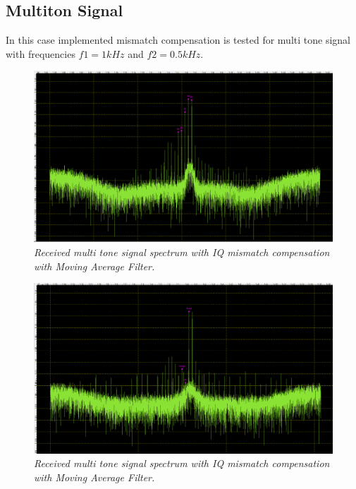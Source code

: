 \documentclass[en,printmode]{mgr}
\begin{document}
		\newpage
   		\subsection*{Multiton Signal}
   		In this case implemented mismatch compensation is tested for
		multi tone signal with frequencies $f1=1kHz$ and $f2=0.5kHz$.
		
		\begin{figure}[H]
    		\centering
   			\includegraphics[width=\textwidth]{plots/multi_input.png}
   		 	\caption{\textit{Received multi tone signal spectrum with IQ mismatch compensation with
   		 	Moving Average Filter.}}
   		\end{figure}	
   		
  		\begin{figure}[H]
    		\centering
   			\includegraphics[width=\textwidth]{plots/my_multi_mav.png}
   		 	\caption{\textit{Received multi tone signal spectrum with IQ mismatch compensation with
   		 	Moving Average Filter.}}
   		\end{figure}	
   		
\end{document}
